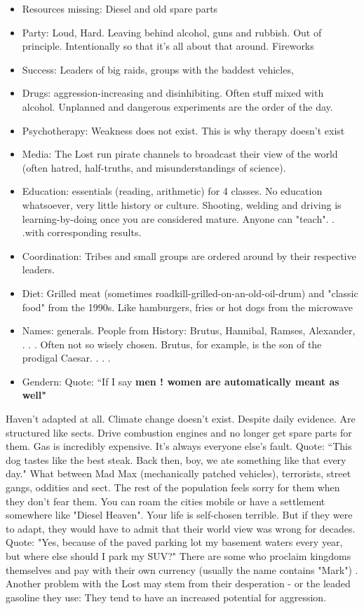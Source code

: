 \begin{itemize}
    \item Resources missing: Diesel and old spare parts
    \item Party: Loud, Hard. Leaving behind alcohol, guns and rubbish. Out of principle. Intentionally so that it's all about that around. Fireworks
    \item Success: Leaders of big raids, groups with the baddest vehicles,
    \item Drugs: aggression-increasing and disinhibiting. Often stuff mixed with alcohol. Unplanned and dangerous experiments are the order of the day.
    \item Psychotherapy: Weakness does not exist. This is why therapy doesn't exist
    \item Media: The Lost run pirate channels to broadcast their view of the world (often hatred, half-truths, and misunderstandings of science).
    \item Education: essentials (reading, arithmetic) for 4 classes. No education whatsoever, very little history or culture. Shooting, welding and driving is learning-by-doing once you are considered mature. Anyone can "teach". . .with corresponding results.
    \item Coordination: Tribes and small groups are ordered around by their respective leaders.
    \item Diet: Grilled meat (sometimes roadkill-grilled-on-an-old-oil-drum) and "classic food" from the 1990s. Like hamburgers, fries or hot dogs from the microwave
    \item Names: generals. People from History: Brutus, Hannibal, Ramses, Alexander, . . . Often not so wisely chosen. Brutus, for example, is the son of the prodigal Caesar. . . .
    \item Gendern: Quote: “If I say \bf{men !} women are automatically meant as well"

\end{itemize}

Haven't adapted at all. Climate change doesn't exist. Despite daily evidence. Are structured like sects. Drive combustion engines and no longer get spare parts for them. Gas is incredibly expensive. It's always everyone else's fault. Quote: “This dog tastes like the best steak. Back then, boy, we ate something like that every day." What between Mad Max (mechanically patched vehicles), terrorists, street gangs, oddities and sect. The rest of the population feels sorry for them when they don't fear them. You can roam the cities mobile or have a settlement somewhere like "Diesel Heaven". Your life is self-chosen terrible. But if they were to adapt, they would have to admit that their world view was wrong for decades. Quote: "Yes, because of the paved parking lot my basement waters every year, but where else should I park my SUV?" There are some who proclaim kingdoms themselves and pay with their own currency (usually the name contains "Mark") . Another problem
with the Lost may stem from their desperation - or the leaded gasoline they use: They tend to have an increased potential for aggression.


